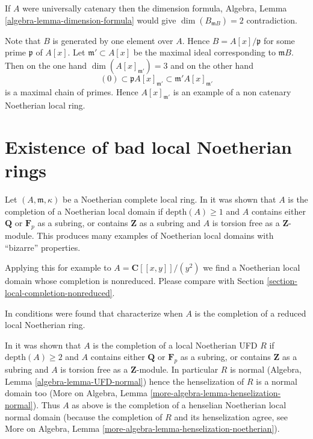 \medskip\noindent
If $A$ were universally catenary then the dimension formula,
Algebra, Lemma \ref{algebra-lemma-dimension-formula}
would give $\dim(B_{\mathfrak mB}) = 2$ contradiction.

\medskip\noindent
Note that $B$ is generated by one element over $A$.
Hence $B = A[x]/\mathfrak p$ for some prime
$\mathfrak p$ of $A[x]$. Let $\mathfrak m' \subset A[x]$ be
the maximal ideal corresponding to $\mathfrak mB$. Then on
the one hand $\dim(A[x]_{\mathfrak m'}) = 3$ and on the
other hand
$$
(0)
\subset \mathfrak pA[x]_{\mathfrak m'}
\subset \mathfrak m'A[x]_{\mathfrak m'}
$$
is a maximal chain of primes. Hence $A[x]_{\mathfrak m'}$ is
an example of a non catenary Noetherian local ring.





\section{Existence of bad local Noetherian rings}
\label{section-bad}

\noindent
Let $(A, \mathfrak m, \kappa)$ be a Noetherian complete local ring.
In \cite{Lech} it was shown that $A$ is the completion of a Noetherian
local domain if $\text{depth}(A) \geq 1$ and $A$ contains either
$\mathbf{Q}$ or $\mathbf{F}_p$ as a subring, or contains $\mathbf{Z}$
as a subring and $A$ is torsion free as a $\mathbf{Z}$-module.
This produces many examples of Noetherian local domains with
``bizarre'' properties.

\medskip\noindent
Applying this for example to $A = \mathbf{C}[[x, y]]/(y^2)$ we find
a Noetherian local domain whose completion is nonreduced.
Please compare with
Section \ref{section-local-completion-nonreduced}.

\medskip\noindent
In \cite{LLPY} conditions were found that characterize when $A$ is
the completion of a reduced local Noetherian ring.

\medskip\noindent
In \cite{Heitmann-completion-UFD} it was shown that $A$ is the completion
of a local Noetherian UFD $R$ if $\text{depth}(A) \geq 2$ and $A$ contains
either $\mathbf{Q}$ or $\mathbf{F}_p$ as a subring, or contains $\mathbf{Z}$
as a subring and $A$ is torsion free as a $\mathbf{Z}$-module.
In particular $R$ is normal (Algebra, Lemma \ref{algebra-lemma-UFD-normal})
hence the henselization of $R$ is a normal domain too
(More on Algebra, Lemma \ref{more-algebra-lemma-henselization-normal}).
Thus $A$ as above is the completion of a henselian Noetherian local
normal domain (because the completion of $R$ and its henselization agree,
see More on Algebra, Lemma \ref{more-algebra-lemma-henselization-noetherian}).

